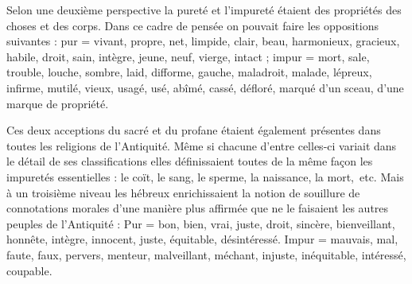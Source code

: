  Selon une deuxième perspective la pureté et l'impureté étaient des propriétés des choses et des corps. Dans ce cadre de pensée on pouvait faire les oppositions suivantes : pur = vivant, propre, net, limpide, clair, beau, harmonieux, gracieux, habile, droit, sain, intègre, jeune, neuf, vierge, intact ; impur = mort, sale, trouble, louche, sombre, laid, difforme, gauche, maladroit, malade, lépreux, infirme, mutilé, vieux, usagé, usé, abîmé, cassé, défloré, marqué d'un sceau, d'une marque de propriété.

 Ces deux acceptions du sacré et du profane étaient également présentes dans toutes les religions de l'Antiquité. Même si chacune d'entre celles-ci variait dans le détail de ses classifications elles définissaient toutes de la même façon les impuretés essentielles : le coït, le sang, le sperme, la naissance, la mort,~etc. Mais à un troisième niveau les hébreux enrichissaient la notion de souillure de connotations morales d'une manière plus affirmée que ne le faisaient les autres peuples de l'Antiquité : Pur = bon, bien, vrai, juste, droit, sincère, bienveillant, honnête, intègre, innocent, juste, équitable, désintéressé. Impur = mauvais, mal, faute, faux, pervers, menteur, malveillant, méchant, injuste, inéquitable, intéressé, coupable.


